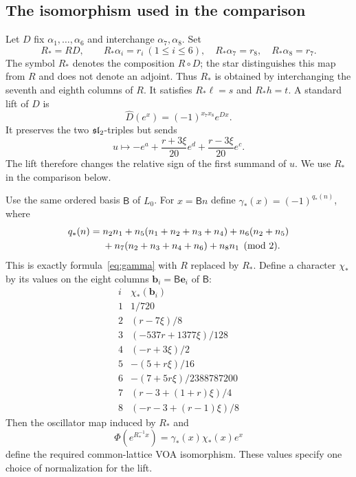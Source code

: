 \documentclass[11pt,reqno]{amsart}
\theoremstyle{definition}\newtheorem{definition}[theorem]{Definition}
\theoremstyle{remark}\newtheorem{remark}[theorem]{Remark}
\numberwithin{equation}{section}
\begin{document}
\subsection{The isomorphism used in the comparison}
Let $D$ fix $\alpha_1,\ldots,\alpha_6$ and interchange $\alpha_7,\alpha_8$. Set
\begin{equation}\label{eq:correctedmap}
 R_* = RD,\qquad R_*\alpha_i=r_i\ (1\le i\le6),\quad
 R_*\alpha_7=r_8,\quad R_*\alpha_8=r_7.
\end{equation}
The symbol $R_*$ denotes the composition $R\circ D$; the star distinguishes this map from $R$ and does not denote an adjoint. Thus $R_*$ is obtained by interchanging the seventh and eighth columns of $R$. It satisfies $R_*\ell=s$ and $R_*h=t$. A standard lift of $D$ is
\[
 \widehat D(e^x)=(-1)^{x_7x_8}e^{Dx}.
\]
It preserves the two $\mathfrak{sl}_2$-triples but sends
\[
 u\longmapsto-e^a+\frac{r+3\xi }{20}e^d+\frac{r-3\xi }{20}e^c.
\]
The lift therefore changes the relative sign of the first summand of $u$. We use $R_*$ in the comparison below.

Use the same ordered basis $\mathsf B$ of $L_0$. For $x=\mathsf Bn$ define $\gamma_*(x)=(-1)^{q_*(n)}$, where
\begin{align}\label{eq:qstar}
 q_*(n)={}&n_2n_1+n_5(n_1+n_2+n_3+n_4)+n_6(n_2+n_5)\notag\\
       &+n_7(n_2+n_3+n_4+n_6)+n_8n_1\pmod2.
\end{align}
This is exactly formula~\eqref{eq:gamma} with $R$ replaced by $R_*$. Define a character $\chi_*$ by its values on the eight columns $\mathbf b_i=\mathsf B\mathbf e_i$ of $\mathsf B$:
\begin{equation}\label{eq:characterstar}
\begin{array}{c|l}
 i&\chi_*(\mathbf b_i)\\\hline
1&1/720\\
2&(r-7\xi )/8\\
3&(-537r+1377\xi )/128\\
4&(-r+3\xi )/2\\
5&-(5+r\xi )/16\\
6&-(7+5r\xi )/2388787200\\
7&(r-3+(1+r)\xi )/4\\
8&(-r-3+(r-1)\xi )/8
\end{array}
\end{equation}
Then the oscillator map induced by $R_*$ and
\begin{equation}\label{eq:phistar}
 \Phi(e^{R_*^{-1}x})=\gamma_*(x)\chi_*(x)e^x
\end{equation}
define the required common-lattice VOA isomorphism. These values specify one choice of normalization for the lift.
\end{document}
